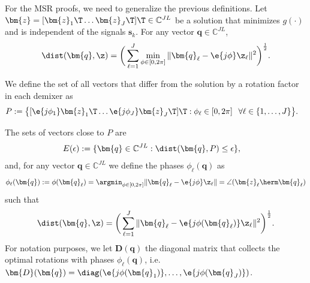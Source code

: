 For the MSR proofs, we need to generalize the previous definitions. Let $\bm{z}=[\bm{z}_1\T \ldots \bm{z}_J\T]\T\in\mathbb{C}^{J L}$ be a solution that minimizes $g(\cdot)$ and is independent of the signals $\bm{s}_k$. For any vector $\bm{q}\in\mathbb{C}^{J L}$,
\begin{equation}
\dist(\bm{q},\z)=\bigg(\sum_{\ell=1}^J \min_{\phi\in[0,2\pi]}\|\bm{q}_{\ell}-\e{j\phi}\z_{\ell}\|^2\bigg)^{\frac{1}{2}}.
\end{equation}

We define the set of all vectors that differ from the solution 
by a rotation factor in each demixer as
\begin{align}
P&:=\big\{[\e{j\phi_1}\bm{z}_1\T\ldots\e{j\phi_J}\bm{z}_J\T]\T:\phi_{\ell}\in[0,2\pi]\,\;\;\forall \ell\in\{1,\ldots,J\}\big\}.
\end{align}

The sets of vectors close to $P$ are
\begin{align}
E(\epsilon)&:=\{\bm{q}\in\mathbb{C}^{J L}:\dist(\bm{q},P)\leq\epsilon\},
\end{align}
and, for any vector $\bm{q}\in\mathbb{C}^{J L}$ we define the phases $\phi_{\ell}(\bm{q})$ as
\begin{equation}
\phi_{\ell}(\bm{q}):=\phi(\bm{q}_{\ell})=\argmin_{\phi\in[0,2\pi]}\|\bm{q}_{\ell}-\e{j\phi}\z_{\ell}\|=\angle(\bm{z}_{\ell}\herm\bm{q}_{\ell})
\end{equation}
such that
\begin{equation}
\dist(\bm{q},\z)=\bigg(\sum_{\ell=1}^J \|\bm{q}_{\ell}-\e{j\phi(\bm{q}_{\ell})}\z_{\ell}\|^2\bigg)^{\frac{1}{2}}.
\end{equation}
For notation purposes, we let $\bm{D}(\bm{q})$ the diagonal matrix that collects the optimal rotations with phases $\phi_{\ell}(\bm{q})$, i.e. $\bm{D}(\bm{q})=\diag(\e{j\phi(\bm{q}_1)},\ldots,\e{j\phi(\bm{q}_J)})$.

